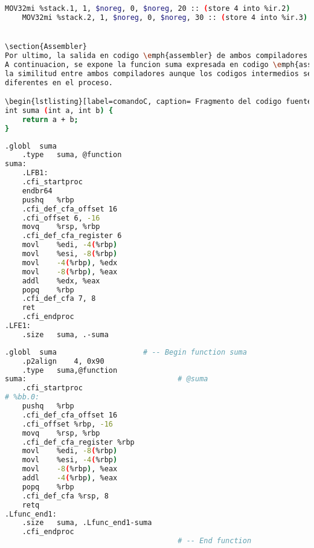 \begin{lstlisting}[label=comandoC, caption= Fragmento de MachineInstr de CLANG/LLVM del archivo machineinstrs \cite{repositorio} para GCC., language=bash]
    MOV32mi %stack.1, 1, $noreg, 0, $noreg, 20 :: (store 4 into %ir.2)
    MOV32mi %stack.2, 1, $noreg, 0, $noreg, 30 :: (store 4 into %ir.3) \end{lstlisting}


\section{Assembler}
Por ultimo, la salida en codigo \emph{assembler} de ambos compiladores es practicamente la misma. 
A continuacion, se expone la funcion suma expresada en codigo \emph{assembler} destacando 
la similitud entre ambos compiladores aunque los codigos intermedios sean notoriamente 
diferentes en el proceso.

\begin{lstlisting}[label=comandoC, caption= Fragmento del codigo fuente del archivo codigo-ejemplo.c \cite{repositorio} para GCC., language=bash]
int suma (int a, int b) {
    return a + b;
}   \end{lstlisting}

\begin{lstlisting}[label=comandoC, caption= Fragmento del codigo \emph{assembler} de GCC del archivo codigo-ejemplo.s \cite{repositorio} para GCC., language=bash]
    .globl	suma
    .type	suma, @function
suma:
    .LFB1:
    .cfi_startproc
    endbr64
    pushq	%rbp
    .cfi_def_cfa_offset 16
    .cfi_offset 6, -16
    movq	%rsp, %rbp
    .cfi_def_cfa_register 6
    movl	%edi, -4(%rbp)
    movl	%esi, -8(%rbp)
    movl	-4(%rbp), %edx
    movl	-8(%rbp), %eax
    addl	%edx, %eax
    popq	%rbp
    .cfi_def_cfa 7, 8
    ret
    .cfi_endproc
.LFE1:
    .size	suma, .-suma    \end{lstlisting}

\begin{lstlisting}[label=comandoC, caption= Fragmento del codigo \emph{assembler} de CLANG/LLVM del archivo assembly.s \cite{repositorio} para GCC., language=bash]
	.globl	suma                    # -- Begin function suma
	.p2align	4, 0x90
	.type	suma,@function
suma:                                   # @suma
	.cfi_startproc
# %bb.0:
	pushq	%rbp
	.cfi_def_cfa_offset 16
	.cfi_offset %rbp, -16
	movq	%rsp, %rbp
	.cfi_def_cfa_register %rbp
	movl	%edi, -8(%rbp)
	movl	%esi, -4(%rbp)
	movl	-8(%rbp), %eax
	addl	-4(%rbp), %eax
	popq	%rbp
	.cfi_def_cfa %rsp, 8
	retq
.Lfunc_end1:
	.size	suma, .Lfunc_end1-suma
	.cfi_endproc
                                        # -- End function   \end{lstlisting}